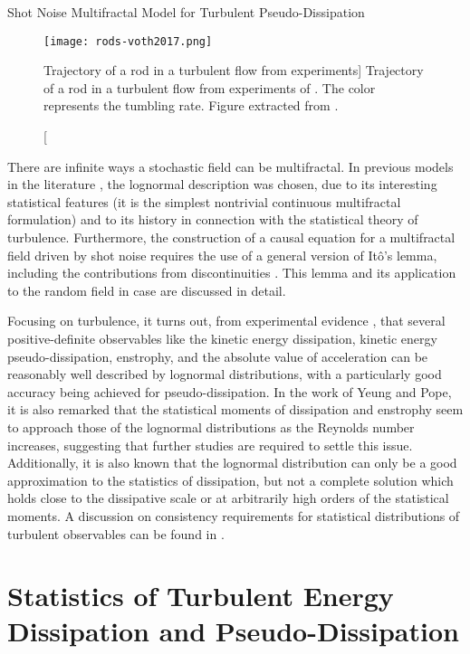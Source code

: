 \begin{chapter}{Shot Noise Multifractal Model for Turbulent Pseudo-Dissipation}
\begin{figure}[t]
    \centering
    \texttt{[image: rods-voth2017.png]}
    \caption
    [Trajectory of a rod in a turbulent flow from experiments]
    {Trajectory of a rod in a turbulent flow from experiments of \textcite{parsa2012}. The color represents the tumbling rate. Figure extracted from \textcite{voth2017}.}
    \label{fig:rods}
\end{figure}

There are infinite ways a stochastic field can be multifractal. In previous models in the literature \parencite{schmitt2003,perpete2011,pereira2018multifractal}, the lognormal description was chosen, due to its interesting statistical features (it is the simplest nontrivial continuous multifractal formulation) and to its history in connection with the statistical theory of turbulence.
Furthermore, the construction of a causal equation for a multifractal field driven by shot noise requires the use of a general version of It{\^o'}s lemma, including the contributions from discontinuities \parencite{protter2005,klebaner2012}. This lemma and its application to the random field in case are discussed in detail.

Focusing on turbulence, it turns out, from experimental evidence \parencite{yeungpope1989}, that several positive-definite observables like the kinetic energy dissipation, kinetic energy pseudo-dissipation, enstrophy, and the absolute value of acceleration can be reasonably well described by lognormal distributions, with a particularly good accuracy being achieved for pseudo-dissipation.
In the work of Yeung and Pope, it is also remarked that the statistical moments of dissipation and enstrophy seem to approach those of the lognormal distributions as the Reynolds number increases, suggesting that further studies are required to settle this issue.
Additionally, it is also known that the lognormal distribution can only be a good approximation to the statistics of dissipation, but not a complete solution which holds close to the dissipative scale or at arbitrarily high orders of the statistical moments. A discussion on consistency requirements for statistical distributions of turbulent observables can be found in \textcite{frisch1995}.

\section{Statistics of Turbulent Energy Dissipation and Pseudo-Dis\-si\-pa\-tion} \label{sec:stat-dissip}


\end{chapter}
